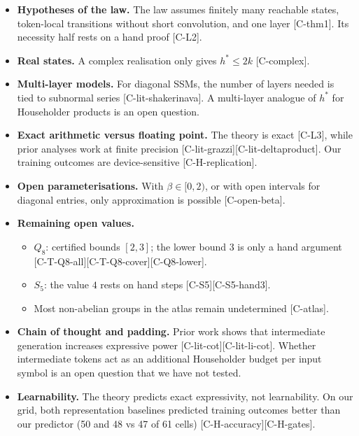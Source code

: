 \documentclass[10pt,twocolumn,a4paper]{article}
\providecommand{\tightlist}{\setlength{\itemsep}{0pt}\setlength{\parskip}{0pt}}
\begin{document}
\begin{itemize}
\tightlist
\item
  \textbf{Hypotheses of the law.} The law assumes finitely many reachable states, token-local transitions without short convolution, and one layer {[}C-thm1{]}. Its necessity half rests on a hand proof {[}C-L2{]}.
\item
  \textbf{Real states.} A complex realisation only gives \(h^* \le 2k\) {[}C-complex{]}.
\item
  \textbf{Multi-layer models.} For diagonal SSMs, the number of layers needed is tied to subnormal series {[}C-lit-shakerinava{]}. A multi-layer analogue of \(h^*\) for Householder products is an open question.
\item
  \textbf{Exact arithmetic versus floating point.} The theory is exact {[}C-L3{]}, while prior analyses work at finite precision {[}C-lit-grazzi{]}{[}C-lit-deltaproduct{]}. Our training outcomes are device-sensitive {[}C-H-replication{]}.
\item
  \textbf{Open parameterisations.} With \(\beta \in [0, 2)\), or with open intervals for diagonal entries, only approximation is possible {[}C-open-beta{]}.
\item
  \textbf{Remaining open values.}

  \begin{itemize}
  \tightlist
  \item
    \(Q_8\): certified bounds \([2,3]\); the lower bound \(3\) is only a hand argument {[}C-T-Q8-all{]}{[}C-T-Q8-cover{]}{[}C-Q8-lower{]}.
  \item
    \(S_5\): the value \(4\) rests on hand steps {[}C-S5{]}{[}C-S5-hand3{]}.
  \item
    Most non-abelian groups in the atlas remain undetermined {[}C-atlas{]}.
  \end{itemize}
\item
  \textbf{Chain of thought and padding.} Prior work shows that intermediate generation increases expressive power {[}C-lit-cot{]}{[}C-lit-li-cot{]}. Whether intermediate tokens act as an additional Householder budget per input symbol is an open question that we have not tested.
\item
  \textbf{Learnability.} The theory predicts exact expressivity, not learnability. On our grid, both representation baselines predicted training outcomes better than our predictor (50 and 48 vs 47 of 61 cells) {[}C-H-accuracy{]}{[}C-H-gates{]}.
\end{itemize}
\end{document}
